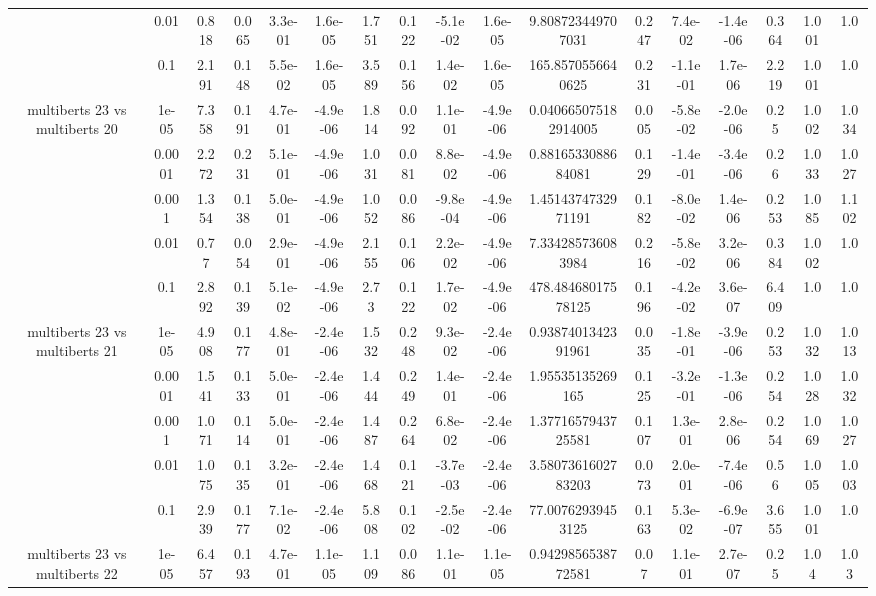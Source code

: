 \begin{tabular}{|c|c|c|c|c|c|c|c|c|c|c|c|c|c|c|c|c|}
 & 0.01 & 0.818 & 0.065 & 3.3e-01 & 1.6e-05 & 1.751 & 0.122 & -5.1e-02 & 1.6e-05 & 9.808723449707031 & 0.247 & 7.4e-02 & -1.4e-06 & 0.364 & 1.001 & 1.0 \\
 & 0.1 & 2.191 & 0.148 & 5.5e-02 & 1.6e-05 & 3.589 & 0.156 & 1.4e-02 & 1.6e-05 & 165.8570556640625 & 0.231 & -1.1e-01 & 1.7e-06 & 2.219 & 1.001 & 1.0 \\
\hline
\multirow{5}{*}{multiberts 23 vs multiberts 20} & 1e-05 & 7.358 & 0.191 & 4.7e-01 & -4.9e-06 & 1.814 & 0.092 & 1.1e-01 & -4.9e-06 & 0.040665075182914005 & 0.005 & -5.8e-02 & -2.0e-06 & 0.25 & 1.002 & 1.034 \\
 & 0.0001 & 2.272 & 0.231 & 5.1e-01 & -4.9e-06 & 1.031 & 0.081 & 8.8e-02 & -4.9e-06 & 0.8816533088684081 & 0.129 & -1.4e-01 & -3.4e-06 & 0.26 & 1.033 & 1.027 \\
 & 0.001 & 1.354 & 0.138 & 5.0e-01 & -4.9e-06 & 1.052 & 0.086 & -9.8e-04 & -4.9e-06 & 1.4514374732971191 & 0.182 & -8.0e-02 & 1.4e-06 & 0.253 & 1.085 & 1.102 \\
 & 0.01 & 0.77 & 0.054 & 2.9e-01 & -4.9e-06 & 2.155 & 0.106 & 2.2e-02 & -4.9e-06 & 7.334285736083984 & 0.216 & -5.8e-02 & 3.2e-06 & 0.384 & 1.002 & 1.0 \\
 & 0.1 & 2.892 & 0.139 & 5.1e-02 & -4.9e-06 & 2.73 & 0.122 & 1.7e-02 & -4.9e-06 & 478.48468017578125 & 0.196 & -4.2e-02 & 3.6e-07 & 6.409 & 1.0 & 1.0 \\
\hline
\multirow{5}{*}{multiberts 23 vs multiberts 21} & 1e-05 & 4.908 & 0.177 & 4.8e-01 & -2.4e-06 & 1.532 & 0.248 & 9.3e-02 & -2.4e-06 & 0.9387401342391961 & 0.035 & -1.8e-01 & -3.9e-06 & 0.253 & 1.032 & 1.013 \\
 & 0.0001 & 1.541 & 0.133 & 5.0e-01 & -2.4e-06 & 1.444 & 0.249 & 1.4e-01 & -2.4e-06 & 1.95535135269165 & 0.125 & -3.2e-01 & -1.3e-06 & 0.254 & 1.028 & 1.032 \\
 & 0.001 & 1.071 & 0.114 & 5.0e-01 & -2.4e-06 & 1.487 & 0.264 & 6.8e-02 & -2.4e-06 & 1.3771657943725581 & 0.107 & 1.3e-01 & 2.8e-06 & 0.254 & 1.069 & 1.027 \\
 & 0.01 & 1.075 & 0.135 & 3.2e-01 & -2.4e-06 & 1.468 & 0.121 & -3.7e-03 & -2.4e-06 & 3.5807361602783203 & 0.073 & 2.0e-01 & -7.4e-06 & 0.56 & 1.005 & 1.003 \\
 & 0.1 & 2.939 & 0.177 & 7.1e-02 & -2.4e-06 & 5.808 & 0.102 & -2.5e-02 & -2.4e-06 & 77.00762939453125 & 0.163 & 5.3e-02 & -6.9e-07 & 3.655 & 1.001 & 1.0 \\
\hline
\multirow{5}{*}{multiberts 23 vs multiberts 22} & 1e-05 & 6.457 & 0.193 & 4.7e-01 & 1.1e-05 & 1.109 & 0.086 & 1.1e-01 & 1.1e-05 & 0.9429856538772581 & 0.07 & 1.1e-01 & 2.7e-07 & 0.25 & 1.04 & 1.03 \\

\end{tabular}
